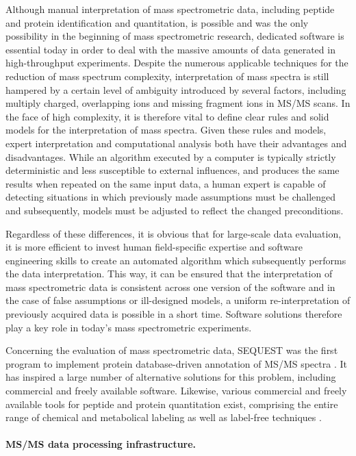 Although manual interpretation of mass spectrometric data, including
peptide and protein identification and quantitation, is possible and was
the only possibility in the beginning of mass spectrometric research, dedicated 
software is essential today in order to deal with the massive amounts of data
generated in high-throughput experiments.
Despite the numerous applicable techniques for the reduction of mass spectrum
complexity, interpretation of mass spectra is still hampered by a certain
level of ambiguity introduced by several factors, including multiply charged, 
overlapping ions and missing fragment ions in MS/MS scans.
In the face of high complexity, it is therefore vital to define clear
rules and solid models for the interpretation of mass spectra.
Given these rules and models, expert interpretation and computational 
analysis both have their advantages and disadvantages.
While an algorithm executed by a computer is typically strictly deterministic 
and less susceptible to external influences, and produces the same results
when repeated on the same input data, a human expert is capable of detecting 
situations in which previously made assumptions must be challenged and 
subsequently, models must be adjusted to reflect the changed preconditions.

Regardless of these differences, it is obvious that for large-scale data
evaluation, it is more efficient to invest human field-specific expertise and
software engineering skills to create an automated algorithm which subsequently
performs the data interpretation.
This way, it can be ensured that the interpretation of mass spectrometric data 
is consistent across one version of the software and in the case of false
assumptions or ill-designed models, a uniform re-interpretation of previously
acquired data is possible in a short time.
Software solutions therefore play a key role in today's mass spectrometric 
experiments.

Concerning the evaluation of mass spectrometric data, SEQUEST was the first
program to implement protein database-driven annotation of MS/MS spectra 
\citep{Eng1994}.
It has inspired a large number of alternative solutions for this problem,
including commercial and freely available software.
Likewise, various commercial and freely available tools for peptide and
protein quantitation exist, comprising the entire range of chemical and 
metabolical labeling as well as label-free techniques \citep{Vaudel2010}.

\paragraph{MS/MS data processing infrastructure.}


